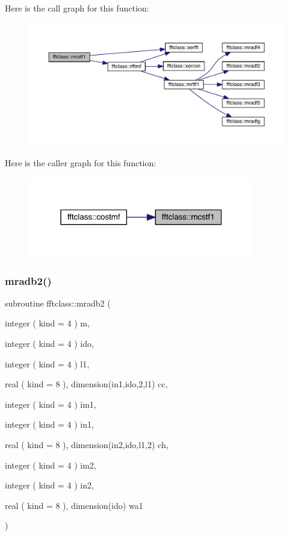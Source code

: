 Here is the call graph for this function\+:\nopagebreak
\begin{figure}[H]
\begin{center}
\leavevmode
\includegraphics[width=350pt]{namespacefftclass_aac5cdc09f4e9979eb972972e1db55cb3_cgraph}
\end{center}
\end{figure}
Here is the caller graph for this function\+:\nopagebreak
\begin{figure}[H]
\begin{center}
\leavevmode
\includegraphics[width=280pt]{namespacefftclass_aac5cdc09f4e9979eb972972e1db55cb3_icgraph}
\end{center}
\end{figure}
\mbox{\label{namespacefftclass_a39691ebdf781bf380b7ef426f4027896}} 
\subsubsection{\texorpdfstring{mradb2()}{mradb2()}}
{\footnotesize\ttfamily subroutine fftclass\+::mradb2 (\begin{DoxyParamCaption}\item[{integer ( kind = 4 )}]{m,  }\item[{integer ( kind = 4 )}]{ido,  }\item[{integer ( kind = 4 )}]{l1,  }\item[{real ( kind = 8 ), dimension(in1,ido,2,l1)}]{cc,  }\item[{integer ( kind = 4 )}]{im1,  }\item[{integer ( kind = 4 )}]{in1,  }\item[{real ( kind = 8 ), dimension(in2,ido,l1,2)}]{ch,  }\item[{integer ( kind = 4 )}]{im2,  }\item[{integer ( kind = 4 )}]{in2,  }\item[{real ( kind = 8 ), dimension(ido)}]{wa1 }\end{DoxyParamCaption})}

